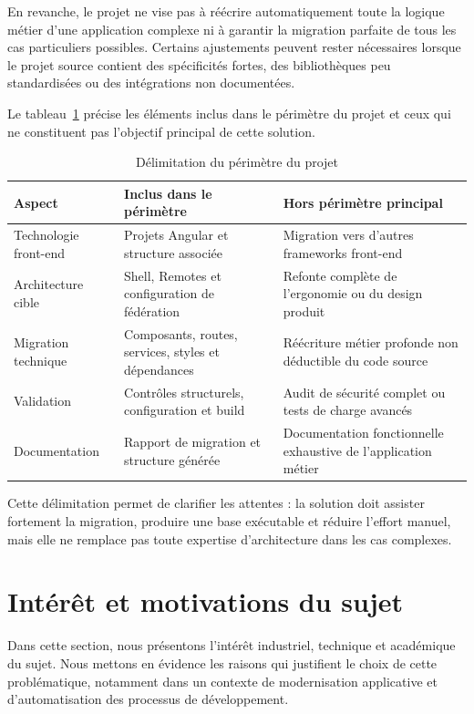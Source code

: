 En revanche, le projet ne vise pas à réécrire automatiquement toute la logique métier d'une application complexe ni à garantir la migration parfaite de tous les cas particuliers possibles. Certains ajustements peuvent rester nécessaires lorsque le projet source contient des spécificités fortes, des bibliothèques peu standardisées ou des intégrations non documentées.

Le tableau~\ref{tab:perimetre-projet} précise les éléments inclus dans le périmètre du projet et ceux qui ne constituent pas l'objectif principal de cette solution.

\begingroup
\renewcommand{\arraystretch}{1.25}
\begin{longtable}{|p{4cm}|p{5cm}|p{5cm}|}
\caption{Délimitation du périmètre du projet}\label{tab:perimetre-projet}\\
\hline
\textbf{Aspect} & \textbf{Inclus dans le périmètre} & \textbf{Hors périmètre principal} \\
\hline
Technologie front-end & Projets Angular et structure associée & Migration vers d'autres frameworks front-end \\
\hline
Architecture cible & Shell, Remotes et configuration de fédération & Refonte complète de l'ergonomie ou du design produit \\
\hline
Migration technique & Composants, routes, services, styles et dépendances & Réécriture métier profonde non déductible du code source \\
\hline
Validation & Contrôles structurels, configuration et build & Audit de sécurité complet ou tests de charge avancés \\
\hline
Documentation & Rapport de migration et structure générée & Documentation fonctionnelle exhaustive de l'application métier \\
\hline
\end{longtable}
\endgroup

Cette délimitation permet de clarifier les attentes : la solution doit assister fortement la migration, produire une base exécutable et réduire l'effort manuel, mais elle ne remplace pas toute expertise d'architecture dans les cas complexes.

\section{Intérêt et motivations du sujet}

Dans cette section, nous présentons l'intérêt industriel, technique et académique du sujet. Nous mettons en évidence les raisons qui justifient le choix de cette problématique, notamment dans un contexte de modernisation applicative et d'automatisation des processus de développement.

